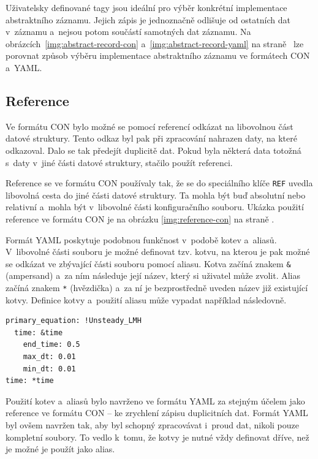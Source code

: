 \documentclass[FM,bw,DP]{tulthesis}
\begin{document}
Uživatelsky definované tagy jsou ideální pro výběr konkrétní implementace abstraktního záznamu. Jejich zápis je jednoznačně odlišuje od ostatních dat v~záznamu a~nejsou potom součástí samotných dat záznamu. Na obrázcích~\ref{img:abstract-record-con} a~\ref{img:abstract-record-yaml} na straně~\pageref{img:abstract-record-con} lze porovnat způsob výběru implementace abstraktního záznamu ve formátech \gls{CON} a~\gls{YAML}.


\subsection{Reference}
\label{sec:navrh-yaml-reference}

Ve formátu \gls{CON} bylo možné se pomocí referencí odkázat na libovolnou část datové struktury. Tento odkaz byl pak při zpracování nahrazen daty, na které odkazoval. Dalo se tak předejít duplicitě dat. Pokud byla některá data totožná s~daty v~jiné části datové struktury, stačilo použít referenci.

Reference se ve formátu \gls{CON} používaly tak, že se do speciálního klíče \texttt{REF} uvedla libovolná cesta do jiné části datové struktury. Ta mohla být buď absolutní nebo relativní a~mohla být v~libovolné části konfiguračního souboru. Ukázka použití reference ve formátu \gls{CON} je na obrázku \ref{img:reference-con} na straně \pageref{img:reference-con}.

Formát \gls{YAML} poskytuje podobnou funkčnost v~podobě kotev a~aliasů. V~libovolné části souboru je možné definovat tzv. kotvu, na kterou je pak možné se odkázat ve zbývající části souboru pomocí aliasu. Kotva začíná znakem \texttt{\&} (ampersand) a~za ním následuje její název, který si uživatel může zvolit. Alias začíná znakem \texttt{*} (hvězdička) a~za ní je bezprostředně uveden název již existující kotvy. Definice kotvy a~použití aliasu může vypadat například následovně.

\vspace{5pt}
\begin{lstlisting}
primary_equation: !Unsteady_LMH
  time: &time
    end_time: 0.5
    max_dt: 0.01
    min_dt: 0.01
time: *time
\end{lstlisting}
\vspace{-20pt}

Použití kotev a~aliasů bylo navrženo ve formátu \gls{YAML} za stejným účelem jako reference ve formátu \gls{CON} -- ke zrychlení zápisu duplicitních dat. Formát \gls{YAML} byl ovšem navržen tak, aby byl schopný zpracovávat i~proud dat, nikoli pouze kompletní soubory. To vedlo k~tomu, že kotvy je nutné vždy definovat dříve, než je možné je použít jako alias.
\end{document}
